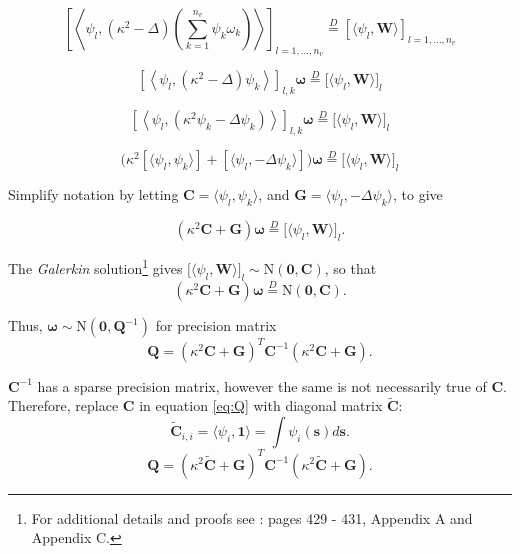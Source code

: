 $$ \left[ \left< \psi_{l}, (\kappa^{2} - \Delta) \left( \sum_{k=1}^{n_{v}} \psi_{k}\omega_{k} \right) \right> \right]_{l = 1, \hdots, n_{v}} 
\overset{D}{=}
\left[ \langle \psi_{l}, \pmb{W} \rangle \right]_{l = 1, \hdots, n_{v}} $$

$$ \left[ \left< \psi_{l}, (\kappa^{2} - \Delta) \psi_{k} \right> \right]_{l,k} \pmb{\omega} 
\overset{D}{=} 
\Big[ \langle \psi_{l}, \pmb{W} \rangle \Big]_{l} $$ 

$$  \left[ \left< \psi_{l}, (\kappa^{2}\psi_{k} - \Delta \psi_{k})  \right> \right]_{l,k} \pmb{\omega} 
\overset{D}{=} 
\Big[ \langle \psi_{l}, \pmb{W} \rangle \Big]_{l}  $$

$$ \Big( \kappa^{2} [ \langle \psi_{l}, \psi_{k} \rangle ] + [ \langle \psi_{l}, -\Delta \psi_{k} \rangle ] \Big) \pmb{\omega} 
\overset{D}{=} 
\Big[ \langle \psi_{l}, \pmb{W} \rangle \Big]_{l} $$

Simplify notation by letting $\pmb{C} = \langle \psi_{l}, \psi_{k} \rangle$, and $ \pmb{G} = \langle \psi_{l}, - \Delta \psi_{k} \rangle$, to give

$$ \left(
\kappa^{2} \pmb{C} + \pmb{G} \right) \pmb{\omega} \overset{D}{=} \Big[ \langle \psi_{l}, \pmb{W} \rangle \Big]_{l}.$$

The {\it Galerkin} solution\footnote{For additional details and proofs see \cite{Lindgren2011}: pages 429 - 431, Appendix A and Appendix C.} gives $\Big[ \langle \psi_{l}, \pmb{W} \rangle \Big]_{l} \sim \text{N}(\pmb{0},\pmb{C})$, so that
$$ \left(
\kappa^{2} \pmb{C} + \pmb{G} \right) \pmb{\omega} \overset{D}{=} \text{N}(\pmb{0},\pmb{C}).$$

Thus, $\pmb{\omega} \sim \text{N}(\pmb{0}, \pmb{Q}^{-1})$ for precision matrix
\begin{equation} \label{eq:Q}
\pmb{Q} = \left( \kappa^{2} \pmb{C} + \pmb{G} \right)^{T} \pmb{C}^{-1} \left( \kappa^{2} \pmb{C} + \pmb{G} \right).
\end{equation}

$\pmb{C}^{-1}$ has a sparse precision matrix, however the same is not necessarily true of $\pmb{C}$. Therefore, replace $\pmb{C}$ in equation \ref{eq:Q} with diagonal matrix $\widetilde{\pmb{C}}$:
$$ \widetilde{\pmb{C}}_{i,i} = \langle \psi_{i}, \pmb{1} \rangle = \int \psi_{i}(\pmb{s}) d\pmb{s}.$$
\begin{equation} \label{eq:Q2}
\pmb{Q} = \left( \kappa^{2} \widetilde{\pmb{C}} + \pmb{G} \right)^{T} \pmb{C}^{-1} \left( \kappa^{2} \widetilde{\pmb{C}} + \pmb{G} \right).
\end{equation}

